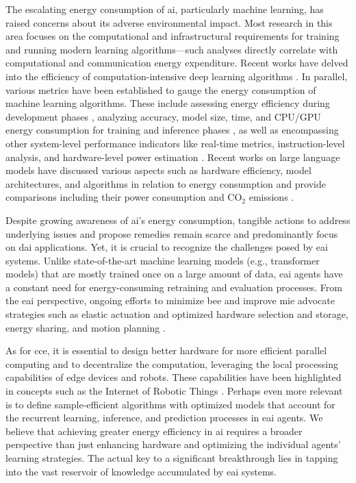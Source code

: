 \documentclass[12pt]{article}
\begin{document}
The escalating energy consumption of \ac{ai}, particularly machine learning, has raised concerns about its adverse environmental impact. Most research in this area focuses on the computational and infrastructural requirements for training and running modern learning algorithms---such analyses directly correlate with computational and communication energy expenditure. Recent works have delved into the efficiency of computation-intensive deep learning algorithms \cite{Schwartz2019GreenAI,Vinuesa2020roleartificialintelligence,Strubell2019EnergyPolicyConsiderations,Luccioni2023EstimatingCarbonFootprint}. In parallel, various metrics have been established to gauge the energy consumption of machine learning algorithms. These include assessing energy efficiency during development phases \cite{Zhou2020HULKEnergyEfficiency}, analyzing accuracy, model size, time, and CPU/GPU energy consumption for training and inference phases \cite{Dalgren2019GreenMLmethodology}, as well as encompassing other system-level performance indicators like real-time metrics, instruction-level analysis, and hardware-level power estimation \cite{GarciaMartin2019Estimationenergyconsumption}. Recent works on large language models have discussed various aspects such as hardware efficiency, model architectures, and algorithms in relation to energy consumption \cite{Vries2023growingenergyfootprint} and provide comparisons including their power consumption and CO$_2$ emissions \cite{SIHCAI2023ArtificialIntelligenceIndex}.

Despite growing awareness of \ac{ai}'s energy consumption, tangible actions to address underlying issues and propose remedies remain scarce and predominantly focus on \ac{dai} applications. Yet, it is crucial to recognize the challenges posed by \ac{eai} systems. Unlike state-of-the-art machine learning models (e.g., transformer models) that are mostly trained once on a large amount of data, \ac{eai} agents have a constant need for energy-consuming retraining and evaluation processes. From the \ac{eai} perspective, ongoing efforts to minimize \ac{bee} and improve \ac{mie} advocate strategies such as elastic actuation and optimized hardware selection and storage, energy sharing, and motion planning \cite{CUT2015Smoothrobotmovements, Mohammed2014MinimizingEnergyConsumption, Chemnitz2011Analyzingenergyconsumption,Vasarhelyi2023OverviewEnergiesProblems,Sekala2024SelectedIssuesMethods}.

As for \ac{cce}, it is essential to design better hardware for more efficient parallel computing and to decentralize the computation, leveraging the local processing capabilities of edge devices and robots. These capabilities have been highlighted in concepts such as the Internet of Robotic Things \cite{Vermesan2020InternetRoboticThings,Sekala2024SelectedIssuesMethods}. Perhaps even more relevant is to define sample-efficient algorithms with optimized models that account for the recurrent learning, inference, and prediction processes in \ac{eai} agents. We believe that achieving greater energy efficiency in \ac{ai} requires a broader perspective than just enhancing hardware and optimizing the individual agents' learning strategies. The actual key to a significant breakthrough lies in tapping into the vast reservoir of knowledge accumulated by \ac{eai} systems.
\end{document}
